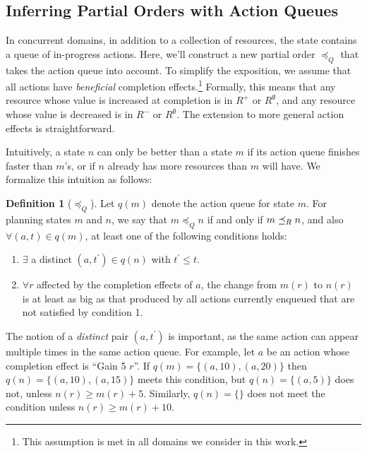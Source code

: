\documentclass[letterpaper]{article}
\theoremstyle{plain} \newtheorem{theorem}{Theorem} \newtheorem{proposition}{Proposition} \newtheorem{lemma}{Lemma}
\theoremstyle{definition} \newtheorem{definition}{Definition} \newtheorem{conjecture}{Conjecture} \newtheorem*{example}{Example}
\theoremstyle{remark} \newtheorem*{remark}{Remark} \newtheorem*{note}{Note} \newtheorem{case}{Case}
\begin{document}
\subsection{Inferring Partial Orders with Action Queues}

\newcommand{\poq}{\preceq_Q}

In concurrent domains, in addition to a collection of resources, the state contains a queue
of in-progress actions. Here, we'll construct a new partial order $\poq$ that takes the
action queue into account. To simplify the exposition, we assume that all
actions have \emph{beneficial} completion effects.\footnote{This assumption is met in all
domains we consider in this work.} Formally, this means that any resource whose value is
increased at completion is in $R^+$ or $R^\emptyset$, and any resource whose value is decreased is in
$R^-$ or $R^\emptyset$. The extension to more general action effects is straightforward.

Intuitively, a state $n$ can only be better than a state $m$ if
its action queue finishes faster than $m$'s, or if $n$ already
has more resources than $m$ will have. We formalize this
intuition as follows:

\begin{definition}[$\poq$]
	\label{def-poq}
	Let $q(m)$ denote the action queue for state $m$. For
  planning states $m$ and $n$, we say that $m \poq n$ if and
  only if $m \preceq_R n$, and also $\forall (a, t) \in q(m)$, at least one of the following conditions holds:
	\begin{enumerate}
		\item $\exists$ a distinct $ (a, t^\prime) \in q(n)$ with $t^\prime \le t$.
		\item $\forall r $ affected by the completion effects of $
      a$, the change from $m(r)$ to $n(r)$ is at least as big
      as that produced by all actions currently enqueued that
      are not satisfied by condition 1.
	\end{enumerate}
\end{definition}
The notion of a \emph{distinct} pair $(a, t^\prime)$ is important, as the same action can appear multiple times in the same action queue. For example, let $a$ be an action whose completion effect is ``Gain 5 $r$''. If $q(m) = \{(a, 10), (a, 20)\}$ then $q(n) = \{(a, 10),
(a, 15)\}$ meets this condition, but $q(n) = \{(a, 5)\}$ does not, unless $n(r) \ge m(r) + 5$. Similarly, $q(n) = \{\}$ does not meet the condition unless $n(r) \ge m(r) + 10$.
\end{document}
